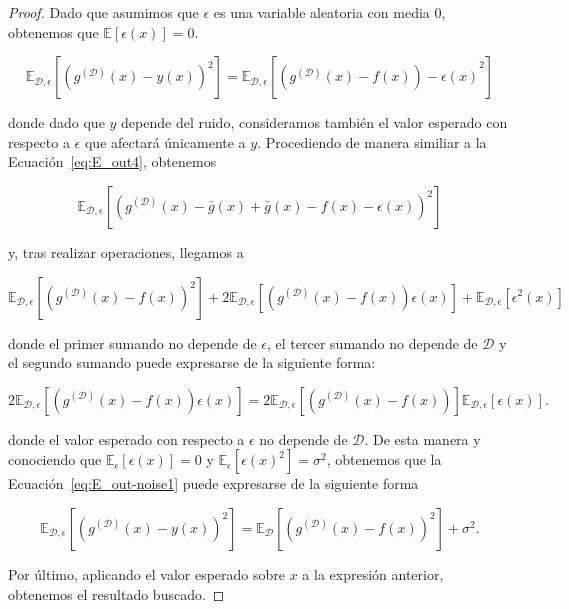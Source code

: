 \begin{proof}
    Dado que asumimos que $\epsilon$ es una variable aleatoria con media $0$, obtenemos que $\mathbb{E}[\epsilon(x)] = 0$.

    \begin{equation}\label{eq:E_out-noise1}
        \mathbb{E}_{\mathcal{D}, \epsilon}[{(g^{\mathcal{(D)}}(x) - y(x))}^2] = \mathbb{E}_{\mathcal{D}, \epsilon}[{(g^{\mathcal{(D)}}(x) - f(x)) - \epsilon(x)}^2]
    \end{equation}

    donde dado que $y$ depende del ruido, consideramos también el valor esperado con respecto a $\epsilon$ que afectará únicamente a $y$. Procediendo de manera similiar a la Ecuación~\eqref{eq:E_out4}, obtenemos

    \begin{equation}
        \mathbb{E}_{\mathcal{D}, \epsilon}[{(g^{\mathcal{(D)}}(x) - \bar{g}(x) + \bar{g}(x) - f(x) - \epsilon(x))}^2]
    \end{equation}

    y, tras realizar operaciones, llegamos a

    \begin{equation}
        \mathbb{E}_{\mathcal{D}, \epsilon}[{(g^{\mathcal{(D)}}(x) - f(x))}^2] + 2\mathbb{E}_{\mathcal{D}, \epsilon}[(g^{\mathcal{(D)}}(x)-f(x))\epsilon(x)] + \mathbb{E}_{\mathcal{D}, \epsilon}[\epsilon^{2}(x)]
    \end{equation}

    donde el primer sumando no depende de $\epsilon$, el tercer sumando no depende de $\mathcal{D}$ y el segundo sumando puede expresarse de la siguiente forma:

    \begin{equation}
        2\mathbb{E}_{\mathcal{D}, \epsilon}[(g^{\mathcal{(D)}}(x)-f(x))\epsilon(x)] = 2\mathbb{E}_{\mathcal{D}, \epsilon}[(g^{\mathcal{(D)}}(x)-f(x))]\mathbb{E}_{\mathcal{D}, \epsilon}[\epsilon(x)].
    \end{equation}

    donde el valor esperado con respecto a $\epsilon$ no depende de $\mathcal{D}$. De esta manera y conociendo que $\mathbb{E}_{\epsilon}[\epsilon(x)] = 0$ y $\mathbb{E}_{\epsilon}[{\epsilon(x)}^{2}] = \sigma^{2}$, obtenemos que la Ecuación~\eqref{eq:E_out-noise1} puede expresarse de la siguiente forma

    \begin{equation}
        \mathbb{E}_{\mathcal{D}, \epsilon}[{(g^{\mathcal{(D)}}(x) - y(x))}^2] = \mathbb{E}_{\mathcal{D}}[{(g^{\mathcal{(D)}}(x) - f(x))}^2] + \sigma^{2}.
    \end{equation}

    Por último, aplicando el valor esperado sobre $x$ a la expresión anterior, obtenemos el resultado buscado.\newline
\end{proof}

